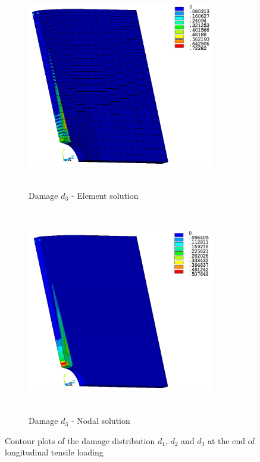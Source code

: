 \documentclass[12pt,a4paper,twoside,openright]{report}
\begin{document}
\begin{figure}[htbp!]\ContinuedFloat     
     \begin{subfigure}[b]{0.4\textwidth}
         \includegraphics[width=8.2cm,height=9cm]{27.d3-lt-e.png}
         \caption{Damage $d_{3}$ - Element solution}
         \label{fig:d3-lt-e}
     \end{subfigure}
     \hspace{1.9cm}
     \begin{subfigure}[b]{0.4\textwidth}
         \includegraphics[width=8.2cm,height=9cm]{27.d3-lt-n.png}
         \caption{Damage $d_{3}$ - Nodal solution}
         \label{fig:d3-lt-n}
     \end{subfigure}
        \caption{Contour plots of the damage distribution $d_{1}$, $d_{2}$ and $d_{3}$ at the end of longitudinal tensile loading }
        \label{fig:Contour plots of the damage d1,d2,d3}     
\end{figure}
\FloatBarrier
\end{document}
